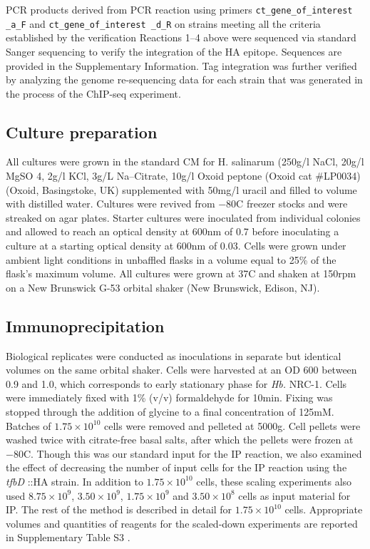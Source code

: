 PCR products derived from PCR reaction using primers {\tt ct\_gene\_of\_interest \_a\_F} and {\tt ct\_gene\_of\_interest \_d\_R} on strains meeting all the criteria established by the verification Reactions 1–4 above were sequenced via standard Sanger sequencing to verify the integration of the HA epitope. Sequences are provided in the Supplementary Information. Tag integration was further verified by analyzing the genome re-sequencing data for each strain that was generated in the process of the ChIP-seq experiment.

\subsection{Culture preparation}

All cultures were grown in the standard CM for H. salinarum (250g/l NaCl, 20g/l MgSO 4, 2g/l KCl, 3g/L Na–Citrate, 10g/l Oxoid peptone (Oxoid cat \#LP0034) (Oxoid, Basingstoke, UK) supplemented with 50mg/l uracil and filled to volume with distilled water. Cultures were revived from −80\degree C freezer stocks and were streaked on agar plates. Starter cultures were inoculated from individual colonies and allowed to reach an optical density at 600nm of 0.7 before inoculating a culture at a starting optical density at 600nm of 0.03. Cells were grown under ambient light conditions in unbaffled flasks in a volume equal to 25\% of the flask's maximum volume. All cultures were grown at 37\degree C and shaken at 150rpm on a New Brunswick G-53 orbital shaker (New Brunswick, Edison, NJ).

\subsection{Immunoprecipitation}

Biological replicates were conducted as inoculations in separate but identical volumes on the same orbital shaker. Cells were harvested at an OD 600 between 0.9 and 1.0, which corresponds to early stationary phase for {\em Hb.} NRC-1. Cells were immediately fixed with 1\% (v/v) formaldehyde for 10min. Fixing was stopped through the addition of glycine to a final concentration of 125mM. Batches of $1.75 \times 10^{10}$ cells were removed and pelleted at 5000g. Cell pellets were washed twice with citrate-free basal salts, after which the pellets were frozen at −80\degree C. Though this was our standard input for the IP reaction, we also examined the effect of decreasing the number of input cells for the IP reaction using the {\em tfbD} ::HA strain. In addition to $1.75 \times 10^{10}$ cells, these scaling experiments also used $8.75 \times 10^9$, $3.50 \times 10^9$, $1.75 \times 10^9$ and $3.50 \times 10^8$ cells as input material for IP. The rest of the method is described in detail for $1.75 \times 10^{10}$ cells. Appropriate volumes and quantities of reagents for the scaled-down experiments are reported in Supplementary Table S3 .

